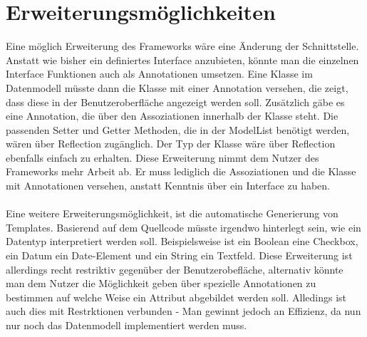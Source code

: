 \chapter{Erweiterungsmöglichkeiten}

Eine möglich Erweiterung des Frameworks wäre eine Änderung der Schnittstelle. Anstatt wie bisher ein definiertes Interface anzubieten,
könnte man die einzelnen Interface Funktionen auch als Annotationen umsetzen. Eine Klasse im Datenmodell müsste dann die Klasse mit einer
Annotation versehen, die zeigt, dass diese in der Benutzeroberfläche angezeigt werden soll. 
Zusätzlich gäbe es eine Annotation, die über den Assoziationen innerhalb der Klasse steht. Die passenden Setter und Getter Methoden, die in der
ModelList benötigt werden, wären über Reflection zugänglich. Der Typ der Klasse wäre über Reflection ebenfalls einfach zu erhalten.
Diese Erweiterung nimmt dem Nutzer des Frameworks mehr Arbeit ab. Er muss lediglich die Assoziationen und die Klasse mit Annotationen versehen, anstatt
Kenntnis über ein Interface zu haben.\\
\\
Eine weitere Erweiterungsmöglichkeit, ist die automatische Generierung von Templates. Basierend auf dem Quellcode müsste irgendwo hinterlegt sein,
wie ein Datentyp interpretiert werden soll. Beispielsweise ist ein Boolean eine Checkbox, ein Datum ein Date-Element und ein String ein Textfeld.
Diese Erweiterung ist allerdings recht restriktiv gegenüber der Benutzerobefläche, alternativ könnte man dem Nutzer die Möglichkeit geben über spezielle 
Annotationen zu bestimmen auf welche Weise ein Attribut abgebildet werden soll. Alledings ist auch dies mit Restrktionen verbunden - Man gewinnt jedoch an Effizienz, da
nun nur noch das Datenmodell implementiert werden muss.

